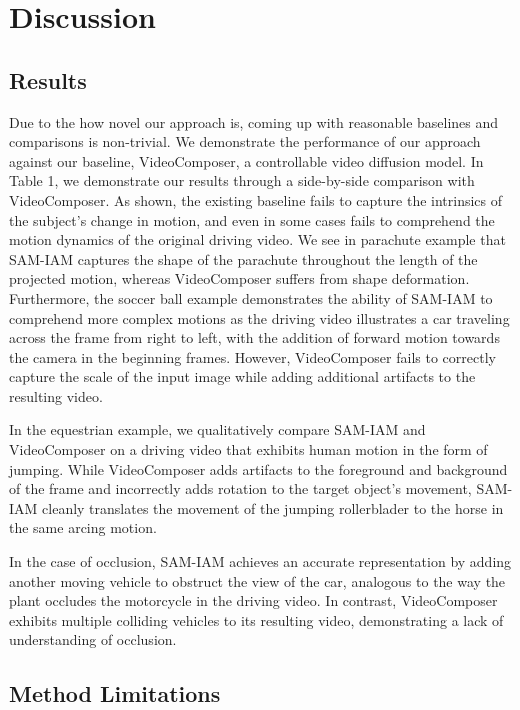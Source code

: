 \section{Discussion}

\subsection{Results}
Due to the how novel our approach is, coming up with reasonable baselines and comparisons is non-trivial. We demonstrate the performance of our approach against our baseline, VideoComposer, a controllable video diffusion model. In Table 1, we demonstrate our results through a side-by-side comparison with VideoComposer. As shown, the existing baseline fails to capture the intrinsics of the subject's change in motion, and even in some cases fails to comprehend the motion dynamics of the original driving video. We see in parachute example that SAM-IAM captures the shape of the parachute throughout the length of the projected motion, whereas VideoComposer suffers from shape deformation. Furthermore, the soccer ball example demonstrates the ability of SAM-IAM to comprehend more complex motions as the driving video illustrates a car traveling across the frame from right to left, with the addition of forward motion towards the camera in the beginning frames. However, VideoComposer fails to correctly capture the scale of the input image while adding additional artifacts to the resulting video.

In the equestrian example, we qualitatively compare SAM-IAM and VideoComposer on a driving video that exhibits human motion in the form of jumping. While VideoComposer adds artifacts to the foreground and background of the frame and incorrectly adds rotation to the target object's movement, SAM-IAM cleanly translates the movement of the jumping rollerblader to the horse in the same arcing motion.

In the case of occlusion, SAM-IAM achieves an accurate representation by adding another moving vehicle to obstruct the view of the car, analogous to the way the plant occludes the motorcycle in the driving video. In contrast, VideoComposer exhibits multiple colliding vehicles to its resulting video, demonstrating a lack of understanding of occlusion. 

\subsection{Method Limitations}

